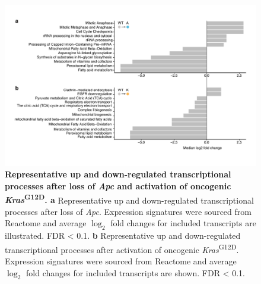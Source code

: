 \begin{flushleft}
\begin{figure}[H]
\centering
\includegraphics[width=\textwidth,
                height=\textheight,
                keepaspectratio]{figures/adenomaprofiling/pdf/fig_1_6_2.pdf}
\caption[Representative up and down-regulated transcriptional processes after loss of \textit{Apc} and activation of oncogenic \textit{Kras}\textsuperscript{G12D}]{
\textbf{Representative up and down-regulated transcriptional processes after loss of \textit{Apc} and activation of oncogenic \textit{Kras}\textsuperscript{G12D}. a} Representative up and down-regulated transcriptional processes after loss of \textit{Apc}. Expression signatures were sourced from Reactome and average $\log_{2}$ fold changes for included transcripts are illustrated. FDR < 0.1.
\textbf{b} Representative up and down-regulated transcriptional processes after activation of oncogenic \textit{Kras}\textsuperscript{G12D}. Expression signatures were sourced from Reactome and average $\log_{2}$ fold changes for included transcripts are shown. FDR < 0.1.
}
\label{fig_162}
\end{figure}
\bigbreak


\end{flushleft}
